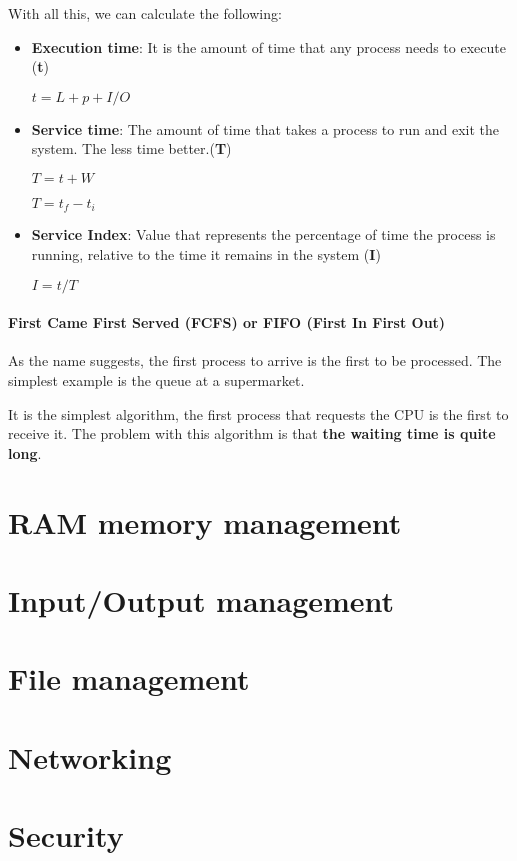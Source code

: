 With all this, we can calculate the following:

\begin{itemize}
    \item \textbf{Execution time}: It is the amount of time that any process needs to execute (\textbf{t})
    \begin{center}
        $t = L + p + I/O$
    \end{center}

    \item \textbf{Service time}: The amount of time that takes a
    process to run and exit the system. The less time better.(\textbf{T})

    \begin{center}
        $T = t + W$

        $T = t_{f} - t_{i}$
    \end{center}

    \item \textbf{Service Index}: Value that represents the percentage of
    time the process is running, relative to the time it remains in the system (\textbf{I})

    \begin{center}
        $ I = t / T$
    \end{center}
\end{itemize}


\subsubsection{First Came First Served (FCFS) or FIFO (First In First Out)}

As the name suggests, the first process to arrive is the first to be processed. The simplest example is the queue at a supermarket.

It is the simplest algorithm, the first process that requests the CPU is the first to receive it. The problem with this algorithm is that \textbf{the waiting time is quite long}.









\chapter{RAM memory management}



\chapter{Input/Output management}


\chapter{File management}


\chapter{Networking}


\chapter{Security}
